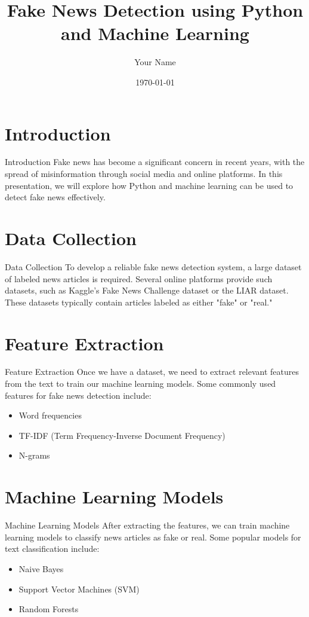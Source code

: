 \documentclass{beamer}
\title{Fake News Detection using Python and Machine Learning}
\author{Your Name}
\date{\today}
\begin{document}
\begin{frame}
  \titlepage
\end{frame}

\section{Introduction}
\begin{frame}{Introduction}
  Fake news has become a significant concern in recent years, with the spread of misinformation through social media and online platforms. In this presentation, we will explore how Python and machine learning can be used to detect fake news effectively.
\end{frame}

\section{Data Collection}
\begin{frame}{Data Collection}
  To develop a reliable fake news detection system, a large dataset of labeled news articles is required. Several online platforms provide such datasets, such as Kaggle's Fake News Challenge dataset or the LIAR dataset. These datasets typically contain articles labeled as either "fake" or "real."
\end{frame}

\section{Feature Extraction}
\begin{frame}{Feature Extraction}
  Once we have a dataset, we need to extract relevant features from the text to train our machine learning models. Some commonly used features for fake news detection include:
  \begin{itemize}
    \item Word frequencies
    \item TF-IDF (Term Frequency-Inverse Document Frequency)
    \item N-grams
  \end{itemize}
\end{frame}

\section{Machine Learning Models}
\begin{frame}{Machine Learning Models}
  After extracting the features, we can train machine learning models to classify news articles as fake or real. Some popular models for text classification include:
  \begin{itemize}
    \item Naive Bayes
    \item Support Vector Machines (SVM)
    \item Random Forests
  \end{itemize}
\end{frame}
\end{document}
